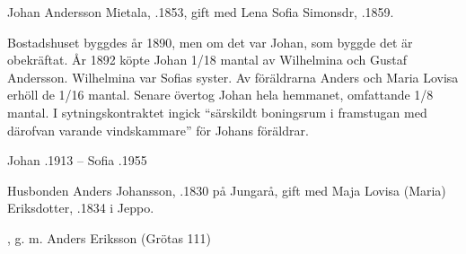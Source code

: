 Johan Andersson Mietala, .1853, gift med Lena Sofia Simonsdr, .1859.
\begin{jhchildren}
  \item {}
  \item {}
  \item {}
  \item {}
  \item {}
  \item {}
  \item {}
  \item {}
\end{jhchildren}

Bostadshuset byggdes år 1890, men om det var Johan, som byggde det är obekräftat. År 1892 köpte Johan 1/18 mantal av Wilhelmina och Gustaf Andersson. Wilhelmina var Sofias syster. Av föräldrarna Anders och Maria Lovisa erhöll de 1/16 mantal. Senare övertog Johan hela hemmanet, omfattande 1/8 mantal. I sytningskontraktet ingick ``särskildt boningsrum i framstugan med därofvan varande vindskammare'' för Johans föräldrar.

Johan .1913  --  Sofia .1955


Husbonden Anders Johansson,  .1830 på Jungarå, gift med Maja Lovisa (Maria) Eriksdotter, .1834 i Jeppo.
\begin{jhchildren}
  \item {}
  \item {}
  \item {}
  \item {}
  \item {}
  \item {}, g. m. Anders Eriksson (Grötas 111)
  \item {}
\end{jhchildren}

